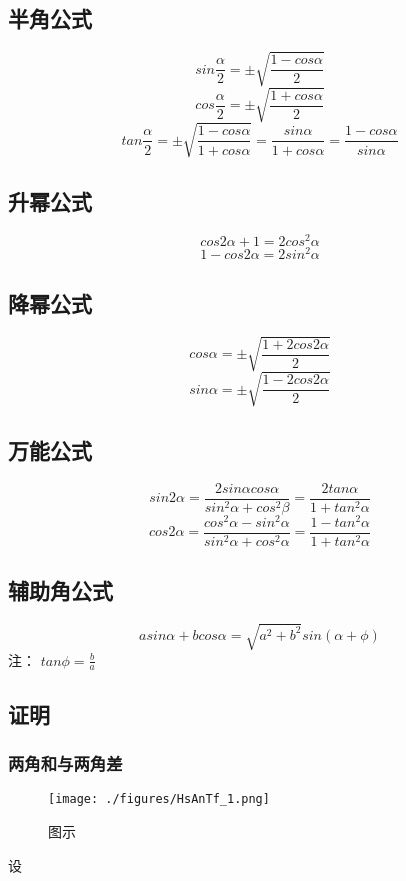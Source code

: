 \subsection{半角公式}
\begin{equation}
sin\frac{\alpha}{2} = \pm\sqrt{\frac{1-cos\alpha}{2}}
\end{equation}
\begin{equation}
cos\frac{\alpha}{2}= \pm\sqrt{\frac{1+cos\alpha}{2}}
\end{equation}
\begin{equation}
tan\frac{\alpha}{2} = \pm\sqrt{\frac{1-cos\alpha}{1+cos\alpha}} = \frac{sin\alpha}{1+cos\alpha} = \frac{1-cos\alpha}{sin\alpha}
\end{equation}

\subsection{升幂公式}
\begin{equation}
cos2\alpha + 1 = 2cos^2\alpha
\end{equation}
\begin{equation}
1-cos2\alpha = 2sin^2\alpha
\end{equation}

\subsection{降幂公式}
\begin{equation}
cos\alpha = \pm\sqrt{\frac{1+2cos2\alpha}{2}}
\end{equation}
\begin{equation}
sin\alpha = \pm\sqrt{\frac{1-2cos2\alpha}{2}}
\end{equation}

\subsection{万能公式}
\begin{equation}
sin2\alpha = \frac{2sin\alpha cos\alpha}{sin^2\alpha + cos^2\beta} = \frac{2tan\alpha}{1+tan^2\alpha}
\end{equation}
\begin{equation}
cos2\alpha = \frac{cos^2\alpha-sin^2\alpha}{sin^2\alpha+cos^2\alpha} = \frac{1-tan^2\alpha}{1+tan^2\alpha}
\end{equation}

\subsection{辅助角公式}
\begin{equation}
asin\alpha + bcos\alpha = \sqrt{a^2+b^2}sin(\alpha + \phi)
\end{equation}
注： $tan\phi = \frac{b}{a}$

\subsection{证明}
\subsubsection{两角和与两角差}
\begin{figure}[ht]
\centering
\texttt{[image: ./figures/HsAnTf\_1.png]}
\caption{图示} \label{HsAnTf_fig1}
\end{figure}
设